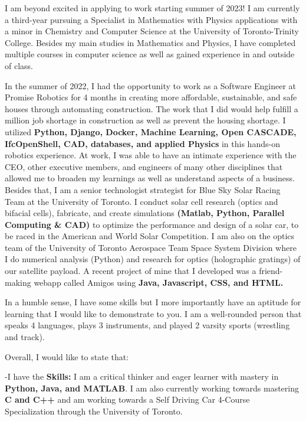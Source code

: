 \documentclass[11pt,a4]{article}
\newcommand{\bold}[1]{ {\bfseries #1}}
\begin{document}
I am beyond excited in applying to work starting summer of 2023! I am 
currently a third-year pursuing a Specialist in Mathematics with Physics applications 
with a minor in Chemistry and Computer Science at the University of Toronto-Trinity College.
Besides my main studies in Mathematics and Physics, I have completed multiple courses 
in computer science as well as gained experience in and outside of class.
\par In the summer of 2022, I had the opportunity to work as a Software 
Engineer at Promise Robotics for 4 months in creating more affordable, 
sustainable, and safe houses through automating construction. The work that I did 
would help fulfill a million job shortage in construction as well as prevent the housing shortage. 
I utilized \bold{Python, Django, Docker, Machine Learning, Open CASCADE,
IfcOpenShell, CAD, databases, and applied Physics} in this hands-on 
robotics experience. At work, I was able to have an intimate experience
with the CEO, other executive members, and engineers of many other 
disciplines that allowed me to broaden my learnings as well as understand 
aspects of a business. Besides that, I am a senior technologist strategist
for Blue Sky Solar Racing Team at the University of Toronto. I conduct
solar cell research (optics and bifacial cells), fabricate, and create
simulations \bold{(Matlab, Python, Parallel Computing \& CAD)} to 
optimize the performance and design of a solar car, to be raced in 
the American and World Solar Competition.  I am also on the optics 
team of the University of Toronto Aerospace Team Space System Division 
where I do numerical analysis (Python) and research for optics 
(holographic gratings) of our satellite payload. A recent project
of mine that I developed was a friend-making webapp called Amigos 
using \bold{Java, Javascript, CSS, and HTML.} \par In a humble sense,
I have some skills but I more importantly have an aptitude for 
learning that I would like to demonstrate to you. I am a well-rounded person that 
speaks 4 languages, plays 3 instruments, and played 2 varsity sports
 (wrestling and track). \par
Overall, I would like to state that:

-I have the \bold{Skills:} I am a critical thinker and eager learner with mastery in
\bold{Python, Java, and MATLAB}. I am also currently working towards mastering
\bold{C and C++} and am working towards a Self Driving Car 4-Course Specialization
through the University of Toronto.\par
\end{document}
